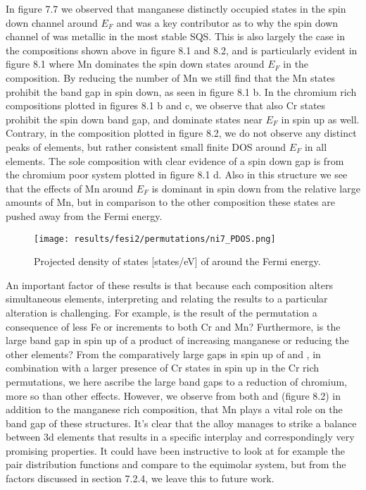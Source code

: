 In figure 7.7 we observed that manganese distinctly occupied states in the spin down channel around $E_F$ and was a key contributor as to why the spin down channel of  was metallic in the most stable SQS. This is also largely the case in the compositions shown above in figure 8.1 and 8.2, and is particularly evident in figure 8.1 where Mn dominates the spin down states around $E_F$ in the  composition. By reducing the number of Mn we still find that the Mn states prohibit the band gap in spin down, as seen in figure 8.1 b. In the chromium rich compositions plotted in figures 8.1 b and c, we observe that also Cr states prohibit the spin down band gap, and dominate states near $E_F$ in spin up as well. Contrary, in the  composition plotted in figure 8.2, we do not observe any distinct peaks of elements, but rather consistent small finite DOS around $E_F$ in all elements.  The sole composition with clear evidence of a spin down gap is from the chromium poor system plotted in figure 8.1 d. Also in this structure we see that the effects of Mn around $E_F$ is dominant in spin down from the relative large amounts of Mn, but in comparison to the other composition these states are pushed away from the Fermi energy.

\begin{figure}[H]
	\centering
	\texttt{[image: results/fesi2/permutations/ni7\_PDOS.png]}
	\caption{Projected density of states [states/eV] of  around the Fermi energy.}
\end{figure}

An important factor of these results is that because each composition alters simultaneous elements, interpreting and relating the results to a particular alteration is challenging. For example, is the result of the  permutation a consequence of less Fe or increments to both Cr and Mn? Furthermore, is the large band gap in spin up of  a product of increasing manganese or reducing the other elements? From the comparatively large gaps in spin up of  and , in combination with a larger presence of Cr states in spin up in the Cr rich permutations, we here ascribe the large band gaps to a reduction of chromium, more so than other effects. However, we observe from both  and  (figure 8.2) in addition to the manganese rich composition, that Mn plays a vital role on the band gap of these structures. It's clear that the  alloy manages to strike a balance between 3d elements that results in a specific interplay and correspondingly very promising properties. It could have been instructive to look at for example the pair distribution functions and compare to the equimolar system, but from the factors discussed in section 7.2.4, we leave this to future work. 

